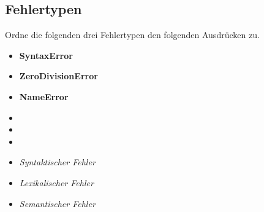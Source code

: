 \subsection{Fehlertypen }

Ordne die folgenden drei Fehlertypen den folgenden Ausdrücken zu.
\begin{multicols}{3}
    \begin{itemize}
        \item[] \textbf{SyntaxError}
        \item[] \textbf{ZeroDivisionError}
        \item[] \textbf{NameError}
    \end{itemize}
    \begin{itemize}
        \item[] 
        \item[] 
        \item[] 
    \end{itemize}
    \begin{itemize}
        \item[] \textit{Syntaktischer Fehler}
        \item[] \textit{Lexikalischer Fehler}
        \item[] \textit{Semantischer Fehler}
    \end{itemize}
\end{multicols}
